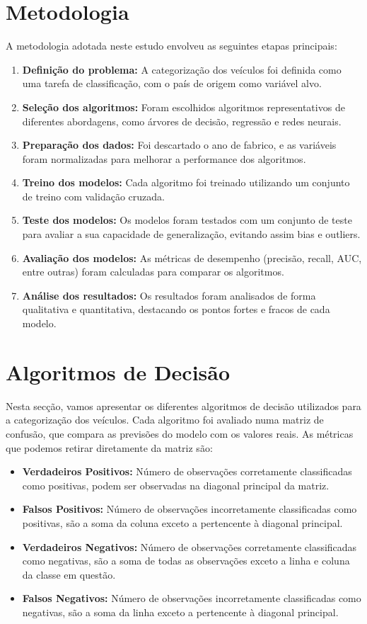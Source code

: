 \documentclass[conference]{IEEEtran}
\begin{document}
\section{Metodologia}
A metodologia adotada neste estudo envolveu as seguintes etapas principais:
\begin{enumerate}
	\item \textbf{Definição do problema:} A categorização dos veículos foi definida como uma tarefa de classificação, com o país de origem como variável alvo.
	\item \textbf{Seleção dos algoritmos:} Foram escolhidos algoritmos representativos de diferentes abordagens, como árvores de decisão, regressão e redes neurais.
	\item \textbf{Preparação dos dados:} Foi descartado o ano de fabrico, e as variáveis foram normalizadas para melhorar a performance dos algoritmos.
	\item \textbf{Treino dos modelos:} Cada algoritmo foi treinado utilizando um conjunto de treino com validação cruzada.
	\item \textbf{Teste dos modelos:} Os modelos foram testados com um conjunto de teste para avaliar a sua capacidade de generalização, evitando assim bias 
	e outliers.
	\item \textbf{Avaliação dos modelos:} As métricas de desempenho (precisão, recall, AUC, entre outras) foram calculadas para comparar os algoritmos.
	\item \textbf{Análise dos resultados:} Os resultados foram analisados de forma qualitativa e quantitativa, destacando os pontos fortes e fracos de cada modelo.
\end{enumerate}

\section{Algoritmos de Decisão}
Nesta secção, vamos apresentar os diferentes algoritmos de decisão utilizados para a categorização dos veículos. Cada algoritmo foi avaliado numa matriz
de confusão, que compara as previsões do modelo com os valores reais. As métricas que podemos retirar diretamente da matriz são:
\begin{itemize}
	\item \textbf{Verdadeiros Positivos:} Número de observações corretamente classificadas como positivas, podem ser observadas na diagonal principal da matriz.
	\item \textbf{Falsos Positivos:} Número de observações incorretamente classificadas como positivas, são a soma da coluna exceto a pertencente à diagonal principal.
	\item \textbf{Verdadeiros Negativos:} Número de observações corretamente classificadas como negativas, são a soma de todas as observações exceto a linha e coluna
	      da classe em questão.
	\item \textbf{Falsos Negativos:} Número de observações incorretamente classificadas como negativas, são a soma da linha exceto a pertencente à diagonal principal.
\end{itemize}
\end{document}
